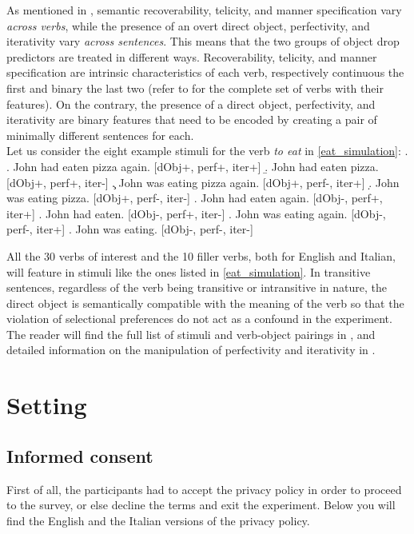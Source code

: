 As mentioned in , semantic recoverability, telicity, and manner specification vary \textit{across verbs}, while the presence of an overt direct object, perfectivity, and iterativity vary \textit{across sentences}. This means that the two groups of object drop predictors are treated in different ways. Recoverability, telicity, and manner specification are intrinsic characteristics of each verb, respectively continuous the first and binary the last two (refer to  for the complete set of verbs with their features). On the contrary, the presence of a direct object, perfectivity, and iterativity are binary features that need to be encoded by creating a pair of minimally different sentences for each.\\
Let us consider the eight example stimuli for the verb \textit{to eat} in \ref{eat_simulation}:
\ex. \label{eat_simulation} \a. John had eaten pizza again. \hfill {\small [dObj+, perf+, iter+]}
\b. John had eaten pizza. \hfill {\small [dObj+, perf+, iter-]}
\c. John was eating pizza again. \hfill {\small [dObj+, perf-, iter+]}
\d. John was eating pizza. \hfill {\small [dObj+, perf-, iter-]}
\e. John had eaten again. \hfill {\small [dObj-, perf+, iter+]}
\e. John had eaten. \hfill {\small [dObj-, perf+, iter-]}
\e. John was eating again. \hfill {\small [dObj-, perf-, iter+]}
\e. John was eating. \hfill {\small [dObj-, perf-, iter-]}

All the 30 verbs of interest and the 10 filler verbs, both for English and Italian, will feature in stimuli like the ones listed in \ref{eat_simulation}. In transitive sentences, regardless of the verb being transitive or intransitive in nature, the direct object is semantically compatible with the meaning of the verb so that the violation of selectional preferences do not act as a confound in the experiment. The reader will find the full list of stimuli and verb-object pairings in , and detailed information on the manipulation of perfectivity and iterativity in .


\section{Setting} 
 
 \subsection{Informed consent} 
 First of all, the participants had to accept the privacy policy in order to proceed to the survey, or else decline the terms and exit the experiment. Below you will find the English and the Italian versions of the privacy policy.

